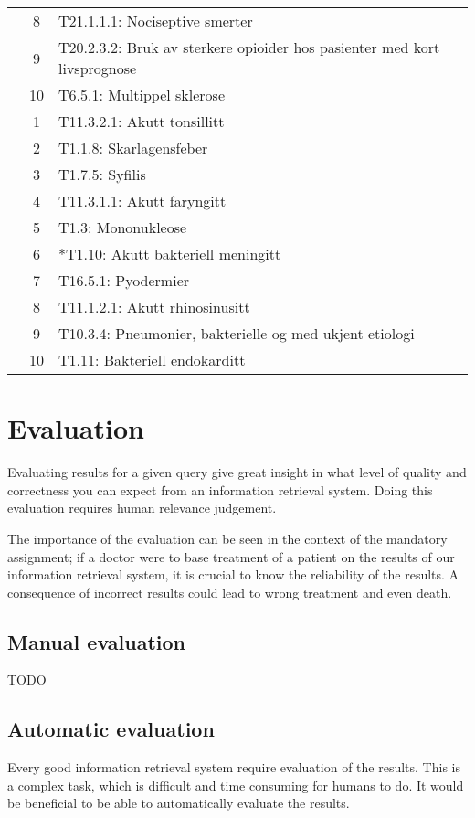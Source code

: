\documentclass[a4paper, 11pt]{article}
\begin{document}
\begin{table}[htbp]
\begin{tabularx}{\textwidth}{c c X}
	 & 8 & T21.1.1.1: Nociseptive smerter \\
	 & 9 & T20.2.3.2: Bruk av sterkere opioider hos pasienter med kort livsprognose \\
	 & 10 & T6.5.1: Multippel sklerose \\
	\addlinespace
	8 & 1 & T11.3.2.1: Akutt tonsillitt \\
	 & 2 & T1.1.8: Skarlagensfeber \\
	 & 3 & T1.7.5: Syfilis \\
	 & 4 & T11.3.1.1: Akutt faryngitt \\
	 & 5 & T1.3: Mononukleose \\
	 & 6 & *T1.10: Akutt bakteriell meningitt \\
	 & 7 & T16.5.1: Pyodermier \\
	 & 8 & T11.1.2.1: Akutt rhinosinusitt \\
	 & 9 & T10.3.4: Pneumonier, bakterielle og med ukjent etiologi \\
	 & 10 & T1.11: Bakteriell endokarditt \\
	\bottomrule
\end{tabularx}
\end{table}


\section{Evaluation}
\label{sec:evaluation}
Evaluating results for a given query give great insight in what level of quality and correctness you can expect from an information retrieval system. Doing this evaluation requires human relevance judgement.

The importance of the evaluation can be seen in the context of the mandatory assignment; if a doctor were to base treatment of a patient on the results of our information retrieval system, it is crucial to know the reliability of the results. A consequence of incorrect results could lead to wrong treatment and even death.

\subsection{Manual evaluation}
TODO

\subsection{Automatic evaluation}
Every good information retrieval system require evaluation of the results. This is a complex task, which is difficult and time consuming for humans to do. It would be beneficial to be able to automatically evaluate the results.
\end{document}

